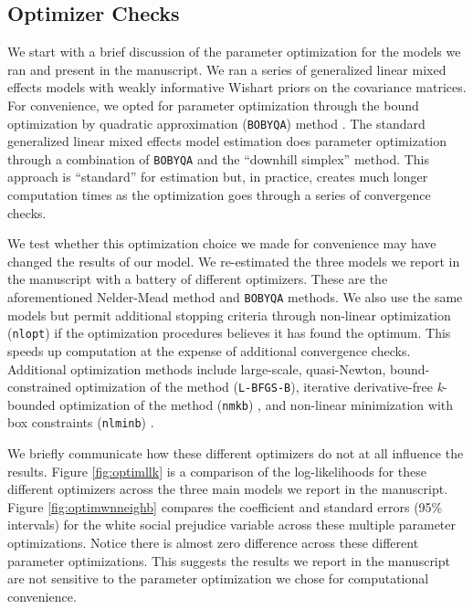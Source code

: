 \documentclass[11pt,]{article}
\begin{document}
\hypertarget{optimizer-checks}{%
\subsection{Optimizer Checks}\label{optimizer-checks}}

We start with a brief discussion of the parameter optimization for the
models we ran and present in the manuscript. We ran a series of
generalized linear mixed effects models with weakly informative Wishart
priors on the covariance matrices. For convenience, we opted for
parameter optimization through the bound optimization by quadratic
approximation (\texttt{BOBYQA}) method \citep[c.f.][]{powell2009bobyqa}.
The standard generalized linear mixed effects model estimation does
parameter optimization through a combination of \texttt{BOBYQA} and the
\citet{neldermead1965smfm} ``downhill simplex'' method. This approach is
``standard'' for estimation but, in practice, creates much longer
computation times as the optimization goes through a series of
convergence checks.

We test whether this optimization choice we made for convenience may
have changed the results of our model. We re-estimated the three models
we report in the manuscript with a battery of different optimizers.
These are the aforementioned Nelder-Mead method and \texttt{BOBYQA}
methods. We also use the same models but permit additional stopping
criteria through non-linear optimization (\texttt{nlopt}) if the
optimization procedures believes it has found the optimum. This speeds
up computation at the expense of additional convergence checks.
Additional optimization methods include large-scale, quasi-Newton,
bound-constrained optimization of the \citet{byrdetal1995lma} method
(\texttt{L-BFGS-B}), iterative derivative-free \emph{k}-bounded
optimization of the \citet{neldermead1965smfm} method (\texttt{nmkb})
\citep{kelley1999imo}, and non-linear minimization with box constraints
(\texttt{nlminb}) \citep[c.f.][]{facchineietal1998asna}.

We briefly communicate how these different optimizers do not at all
influence the results. Figure \ref{fig:optimllk} is a comparison of the
log-likelihoods for these different optimizers across the three main
models we report in the manuscript. Figure \ref{fig:optimwnneighb}
compares the coefficient and standard errors (95\% intervals) for the
white social prejudice variable across these multiple parameter
optimizations. Notice there is almost zero difference across these
different parameter optimizations. This suggests the results we report
in the manuscript are not sensitive to the parameter optimization we
chose for computational convenience.
\end{document}
